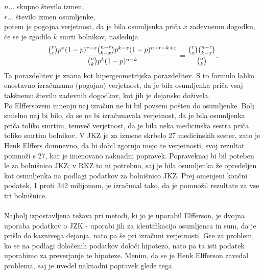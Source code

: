 \documentclass[fin1, tisk]{fmfdelo}
\theoremstyle{definition} %
\theoremstyle{trditev} %
\theoremstyle{izrek}
\begin{document}
$n \dots$ skupno število izmen,\\
$r \dots$ število izmen osumljenke, \\
potem je pogojna verjetnost, da je bila osumljenka priča $x$ zadevnemu dogodku, če se je zgodilo $k$ smrti bolnikov, naslednja 
\begin{equation}\label{eq:l_pogojna}
    \frac{\binom{r}{x}p^x(1-p)^{r-x}\binom{n-r}{k-x}p^{k-x}(1-p)^{n-r-k+x}}{\binom{n}{k}p^k(1-p)^{n-k}} = \frac{\binom{r}{x}\binom{n-r}{k-x}}{\binom{n}{k}}.\vspace{2mm}
\end{equation}
Ta porazdelitev je znana kot hipergeometrijska porazdelitev. S to formulo lahko enostavno izračunamo (pogojno) verjetnost, da je bila osumljenka 
priča vsaj takšnemu številu zadevnih dogodkov, kot jih je dejansko doživela.\\
Po Elffersovem mnenju naj izračun ne bi bil povsem pošten do osumljenke. Bolj smislno naj bi bilo, da se ne bi izračunavala verjetnost, da je 
bila osumljenka priča toliko smrtim, temveč verjetnost, da je bila neka medicinska sestra priča toliko smrtim bolnikov. V JKZ je za izmene skrbelo 
27 medicinskih sester, zato je Henk Elffers domnevno, da bi dobil zgornjo mejo te verjetnosti, svoj rezultat pomnoži s 27, kar je imenovano 
naknadni popravek. Popraveknaj bi bil poteben le za bolnišnico JKZ; v RKZ to ni potrebno, saj je bila osumljenka že opredeljen kot osumljenka 
na podlagi podatkov za bolnišnico JKZ. Prej omenjeni končni podatek, 1 proti 342 milijonom, je izračunal tako, da je pomnožil rezultate za vse 
tri bolnišnice.\\\\
Najbolj izpostavljena težava pri metodi, ki jo je uporabil Elfferson, je dvojna uporaba podatkov o JZK - uporabi jih za identifikacijo osumljenca 
in sum, da je prišlo do kaznivega dejanja, nato pa še pri izračuni verjetnosti. Gre za problem, ko se na podlagi določenih podatkov določi hipotezo, nato 
pa ta isti podatek uporabimo za preverjanje te hipoteze. Menim, da se je Henk Elfferson zavedal problema, saj je uvedel naknadni popravek glede tega. 

\end{document}
